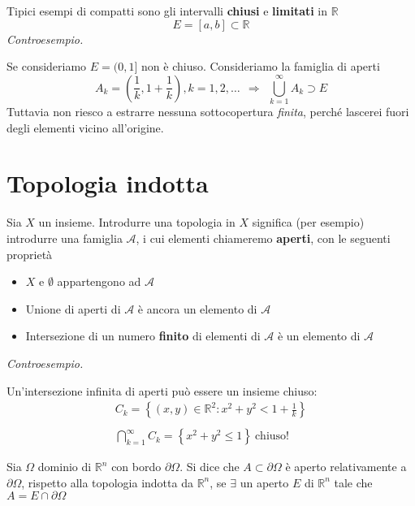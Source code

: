 \documentclass[10pt,a4paper,twoside,openright]{book}
\begin{document}
Tipici esempi di compatti sono gli intervalli \textbf{chiusi} e \textbf{limitati} in $\mathbb{R}$
\begin{equation*}
E=[ a,b] \subset \mathbb{R}
\end{equation*}
\textit{Controesempio.}

Se consideriamo $\displaystyle E=( 0,1]$ non è chiuso. Consideriamo la famiglia di aperti
\begin{equation*}
A_{k} =\left(\frac{1}{k},1+\frac{1}{k}\right),k=1,2,\dotsc \ \ \Rightarrow \ \ \bigcup ^{\infty }_{k=1} A_{k} \supset E
\end{equation*}
Tuttavia non riesco a estrarre nessuna sottocopertura \textit{finita}, perché lascerei fuori degli elementi vicino all'origine.
\section{Topologia indotta}

Sia $X$ un insieme. Introdurre una topologia in $X$ significa (per esempio) introdurre una famiglia $\mathcal{A}$, i cui elementi chiameremo \textbf{aperti}, con le seguenti proprietà
\begin{itemize}
\item $X$ e $\emptyset $ appartengono ad $\mathcal{A}$
\item Unione di aperti di $\mathcal{A}$ è ancora un elemento di $\mathcal{A}$
\item Intersezione di un numero \textbf{finito} di elementi di $\mathcal{A}$ è un elemento di $\mathcal{A}$
\end{itemize}



\textit{Controesempio. }

Un'intersezione infinita di aperti può essere un insieme chiuso:
\begin{gather*}
C_{k} =\left\{(x,y) \in \mathbb{R}^{2} :x^{2} +y^{2} < 1+\frac{1}{k}\right\}\\
\\
\bigcap\limits ^{\infty }_{k=1} C_{k} =\left\{x^{2} +y^{2} \leqslant 1\right\} \ \text{chiuso!}
\end{gather*}

\begin{definition}
 Sia $\Omega $ dominio di $\mathbb{R}^{n}$ con bordo $\partial \Omega $. Si dice che $\displaystyle A\subset \partial \Omega $ è aperto relativamente a $\displaystyle \partial \Omega $, rispetto alla topologia indotta da $\displaystyle \mathbb{R}^{n}$, se $\exists $ un aperto $E$ di $\mathbb{R}^{n}$ tale che $A=E\cap \partial \Omega $
\end{definition}
\end{document}
